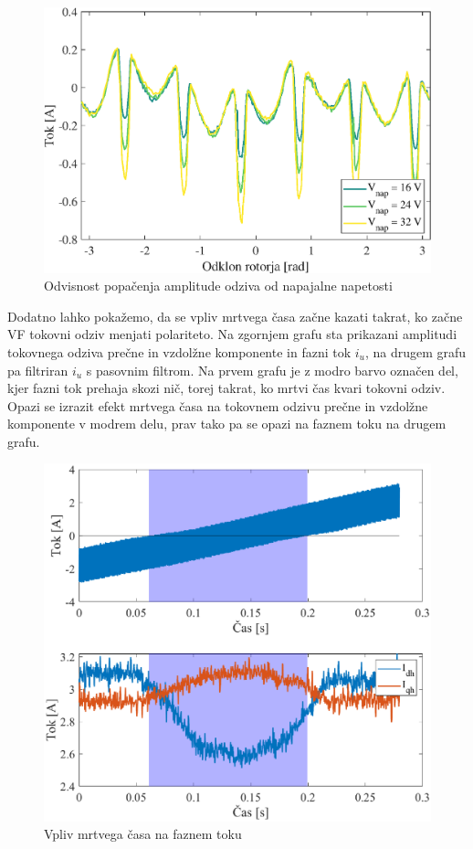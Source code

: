 \documentclass[a4paper,twoside,openright,12pt,slovene]{book}
\begin{document}
\begin{figure}[!htbp]
    \centering
    \includegraphics[width=0.95\columnwidth]{Slike/mrtviCasNapetost.eps}
    \caption{\label{mrtviCasNapetost} Odvisnost popačenja amplitude odziva od napajalne napetosti }
\end{figure}

Dodatno lahko pokažemo, da se vpliv mrtvega časa začne kazati takrat, ko začne VF tokovni odziv menjati polariteto. Na zgornjem grafu sta prikazani amplitudi tokovnega odziva prečne in vzdolžne
komponente in fazni tok $i_u$, na drugem grafu pa filtriran $i_u$ s pasovnim filtrom. Na prvem grafu je z modro barvo označen del, kjer fazni tok prehaja skozi nič, torej takrat, ko mrtvi čas kvari
tokovni odziv. Opazi se izrazit efekt mrtvega časa na tokovnem odzivu prečne in vzdolžne komponente v modrem delu, prav tako pa se opazi na faznem toku na drugem grafu.

\begin{figure}[!htbp]
    \centering
    \includegraphics[width=1\columnwidth]{Slike/mrtviCasFazniTok.eps}
    \caption{\label{mrtviCasFazniTok} Vpliv mrtvega časa na faznem toku }
\end{figure}
\end{document}
